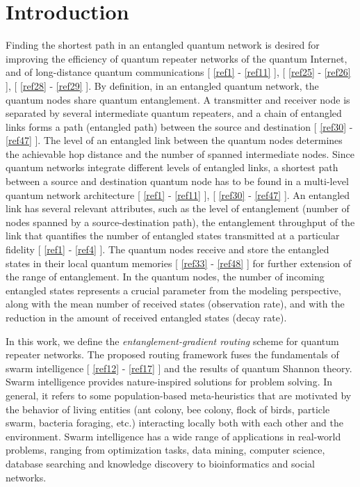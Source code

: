 \documentclass[11pt]{article}%
\newcommand*{\cref}[1]{%
  \begingroup
    \hypersetup{
      linkcolor=linkequation,
      linkbordercolor=linkequation,
    }%
    \ref{#1}%
  \endgroup
}
\begin{document}
\section{Introduction}
\label{sec1}
 Finding the shortest path in an entangled quantum network is desired for improving the efficiency of quantum repeater networks of the quantum Internet, and of long-distance quantum communications [\cref{ref1}-\cref{ref11}], [\cref{ref25}-\cref{ref26}], [\cref{ref28}-\cref{ref29}]. By definition, in an entangled quantum network, the quantum nodes share quantum entanglement. A transmitter and receiver node is separated by several intermediate quantum repeaters, and a chain of entangled links forms a path (entangled path) between the source and destination [\cref{ref30}-\cref{ref47}]. The level of an entangled link between the quantum nodes determines the achievable hop distance and the number of spanned intermediate nodes. Since quantum networks integrate different levels of entangled links, a shortest path between a source and destination quantum node has to be found in a multi-level quantum network architecture [\cref{ref1}-\cref{ref11}], [\cref{ref30}-\cref{ref47}]. An entangled link has several relevant attributes, such as the level of entanglement (number of nodes spanned by a source-destination path), the entanglement throughput of the link that quantifies the number of entangled states transmitted at a particular fidelity [\cref{ref1}-\cref{ref4}]. The quantum nodes receive and store the entangled states in their local quantum memories [\cref{ref33}-\cref{ref48}] for further extension of the range of entanglement. In the quantum nodes, the number of incoming entangled states represents a crucial parameter from the modeling perspective, along with the mean number of received states (observation rate), and with the reduction in the amount of received entangled states (decay rate). 

In this work, we define the \textit{entanglement-gradient routing} scheme for quantum repeater networks. The proposed routing framework fuses the fundamentals of swarm intelligence [\cref{ref12}-\cref{ref17}] and the results of quantum Shannon theory. Swarm intelligence provides nature-inspired solutions for problem solving. In general, it refers to some population-based meta-heuristics that are motivated by the behavior of living entities (ant colony, bee colony, flock of birds, particle swarm, bacteria foraging, etc.) interacting locally both with each other and the environment. Swarm intelligence has a wide range of applications in real-world problems, ranging from optimization tasks, data mining, computer science, database searching and knowledge discovery to bioinformatics and social networks.
\end{document}
